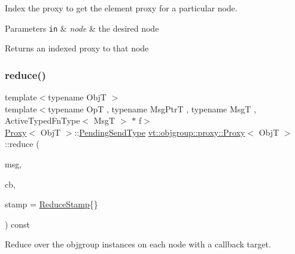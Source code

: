Index the proxy to get the element proxy for a particular node. 


\begin{DoxyParams}[1]{Parameters}
\mbox{\tt in}  & {\em node} & the desired node\\
\hline
\end{DoxyParams}
\begin{DoxyReturn}{Returns}
an indexed proxy to that node 
\end{DoxyReturn}
\mbox{\label{structvt_1_1objgroup_1_1proxy_1_1_proxy_a61273d407174fb496b4aed10ec6650bd}} 
\subsubsection{\texorpdfstring{reduce()}{reduce()}\hspace{0.1cm}{\footnotesize\ttfamily [1/5]}}
{\footnotesize\ttfamily template$<$typename ObjT $>$ \\
template$<$typename OpT , typename Msg\+PtrT , typename MsgT , Active\+Typed\+Fn\+Type$<$ Msg\+T $>$ $\ast$ f$>$ \\
\hyperlink{structvt_1_1objgroup_1_1proxy_1_1_proxy}{Proxy}$<$ ObjT $>$\+::\hyperlink{structvt_1_1objgroup_1_1proxy_1_1_proxy_a1bdf8713203531d306702a024872bb08}{Pending\+Send\+Type} \hyperlink{structvt_1_1objgroup_1_1proxy_1_1_proxy}{vt\+::objgroup\+::proxy\+::\+Proxy}$<$ ObjT $>$\+::reduce (\begin{DoxyParamCaption}\item[{Msg\+PtrT}]{msg,  }\item[{\hyperlink{namespacevt_a36db99df4c973d48b1118a293fff533f}{Callback}$<$ MsgT $>$}]{cb,  }\item[{\hyperlink{structvt_1_1objgroup_1_1proxy_1_1_proxy_a337be4c20cf11ff6477c7a66208cc909}{Reduce\+Stamp}}]{stamp = {\ttfamily \hyperlink{structvt_1_1objgroup_1_1proxy_1_1_proxy_a337be4c20cf11ff6477c7a66208cc909}{Reduce\+Stamp}\{\}} }\end{DoxyParamCaption}) const}



Reduce over the objgroup instances on each node with a callback target. 



